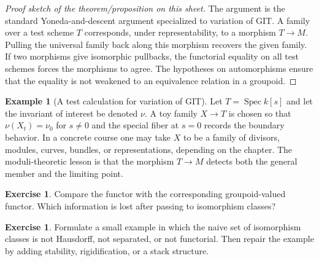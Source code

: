 \documentclass[11pt]{amsart}
\theoremstyle{definition}
\newtheorem{example}[theorem]{Example}
\newtheorem{exercise}[theorem]{Exercise}
\newcommand{\Spec}{\operatorname{Spec}}
\begin{document}
\begin{proof}[Proof sketch of the theorem/proposition on this sheet]
The argument is the standard Yoneda-and-descent argument specialized to variation of GIT.  A family over a test scheme $T$ corresponds, under representability, to a morphism $T\to M$.  Pulling the universal family back along this morphism recovers the given family.  If two morphisms give isomorphic pullbacks, the functorial equality on all test schemes forces the morphisms to agree.  The hypotheses on automorphisms ensure that the equality is not weakened to an equivalence relation in a groupoid.
\end{proof}
\begin{example}[A test calculation for variation of GIT]
Let $T=\Spec k[s]$ and let the invariant of interest be denoted $\nu$.  A toy family $X\to T$ is chosen so that $\nu(X_t)=\nu_0$ for $s\ne0$ and the special fiber at $s=0$ records the boundary behavior.  In a concrete course one may take $X$ to be a family of divisors, modules, curves, bundles, or representations, depending on the chapter.  The moduli-theoretic lesson is that the morphism $T\to M$ detects both the general member and the limiting point.
\end{example}
\begin{exercise}
Compare the functor with the corresponding groupoid-valued functor.  Which information is lost after passing to isomorphism classes?
\end{exercise}
\begin{exercise}
Formulate a small example in which the naive set of isomorphism classes is not Hausdorff, not separated, or not functorial.  Then repair the example by adding stability, rigidification, or a stack structure.
\end{exercise}
\clearpage
\end{document}

